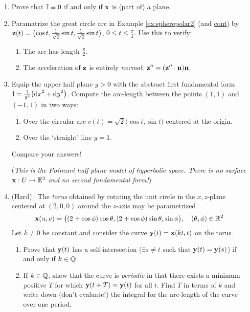 \begin{exercises}
\begin{enumerate}
  
  \item Prove that $\mathbb{I}\equiv 0$ if and only if ${\mathbf{x}}$ is (part of) a plane.


	\item Paramatrize the great circle arc in Example \ref{ex:spherepolar2} (and \href{ex:spherepolar3}{cont}) by ${\mathbf{z}}(t)=\bigl(\cos t,\frac 1{\sqrt 2}\sin t,\frac 1{\sqrt 2}\sin t\bigr)$, $0\le t\le \frac\pi 2$. Use this to verify:
	\begin{enumerate}
	  \item The arc has length $\frac\pi 2$.
	  \item The acceleration of ${\mathbf{z}}$ is entirely \emph{normal}; ${\mathbf{z}}''=({\mathbf{z}}''\cdot{\mathbf{n}}){\mathbf{n}}$.
	\end{enumerate}

  
  \item\label{exs:poincarehalfplane} Equip the upper half plane $y>0$ with the abstract first fundamental form $\mathrm{I}=\frac 1{y^2}\bigl({\mathrm{d} x}^2+{\mathrm{d} y}^2\bigr)$. Compute the arc-length between the points $(1,1)$ and $(-1,1)$ in two ways:%
  \begin{enumerate}
    \item Over the circular arc $c(t)=\sqrt 2\bigl(\cos t,\sin t\bigr)$ centered at the origin.
    \item Over the `straight' line $y=1$.
  \end{enumerate}
  Compare your answers!\par
  (\emph{This is the Poincaré half-plane model of hyperbolic space. There is no surface ${\mathbf{x}}:U\to\mathbb{E}^3$ and no second fundamental form!})
  
  
  \item (Hard) \ The \emph{torus} obtained by rotating the unit circle in the $x,z$-plane centered at $(2,0,0)$ around the $z$-axis may be parametrized
  \[\vx(u,v)=\bigl((2+\cos \phi)\cos\theta,(2+\cos\phi)\sin\theta,\sin\phi\bigr),\quad (\theta,\phi)\in\R^2\vspace{-4pt}\]
  Let $k\neq 0$ be constant and consider the curve ${\mathbf{y}}(t)={\mathbf{x}}(kt,t)$ on the torus.
  \begin{enumerate}
    \item Prove that ${\mathbf{y}}(t)$ has a self-intersection ($\exists s\neq t$ such that ${\mathbf{y}}(t)={\mathbf{y}}(s)$) if and only if $k\in\mathbb{Q}$.
    \item If $k\in\mathbb{Q}$, show that the curve is \emph{periodic} in that there exists a minimum positive $T$ for which ${\mathbf{y}}(t+T)={\mathbf{y}}(t)$ for all $t$. Find $T$ in terms of $k$ and write down (don't evaluate!) the integral for the arc-length of the curve over one period.
  \end{enumerate}
	
\end{enumerate}
\end{exercises}

